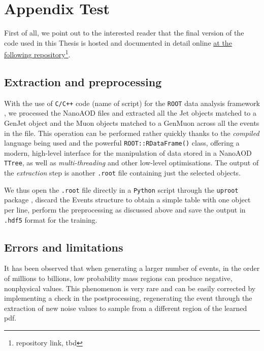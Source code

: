 \chapter{Appendix Test}\label{ch:appx}
First of all, we point out to the interested reader that the final version of the code used in this Thesis is hosted and documented in detail online \href{tbd}{at the following repository}\footnote{repository link, tbd}.

\section{Extraction and preprocessing}
With the use of \texttt{C/C++} code (name of script) for the \texttt{ROOT} data analysis framework \cite{Brun:491486}, we processed the NanoAOD files and extracted all the Jet objects matched to a GenJet object and the Muon objects matched to a GenMuon across all the events in the file. This operation can be performed rather quickly thanks to the \emph{compiled} language being used and the powerful \texttt{ROOT::RDataFrame()} class, offering a modern, high-level interface for the manipulation of data stored in a NanoAOD \texttt{TTree}, as well as \emph{multi-threading} and other low-level optimisations.
The output of the \emph{extraction} step is another \texttt{.root} file containing just the selected objects.

 We thus open the \texttt{.root} file directly in a \texttt{Python} script through the \texttt{uproot} package \cite{jim_pivarski_2022_6791281}, discard the Events structure to obtain a simple table with one object per line, perform the preprocessing as discussed above and save the output in \texttt{.hdf5} format for the training.

\section{Errors and limitations}
It has been observed that when generating a larger number of events, in the order of millions to billions, low probability mass regions can produce negative, nonphysical values. This phenomenon is very rare and can be easily corrected by implementing a check in the postprocessing, regenerating the event through the extraction of new noise values to sample from a different region of the learned pdf.

